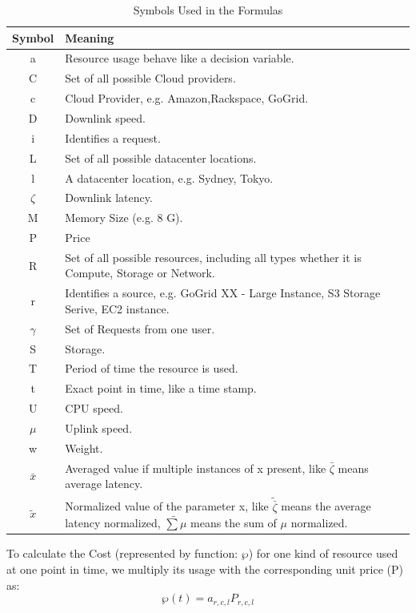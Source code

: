 \begin{longtable}[!ht]{|c|p{10cm}|}
\caption{Symbols Used in the Formulas} \label{table:formula_symbols}\\
\toprule
\textbf{Symbol }&  \textbf{Meaning  }  \\
\midrule
\endfirsthead
a & Resource usage behave like a decision variable. \\
\hline C & Set of all possible Cloud providers. \\
\hline c & Cloud Provider, e.g. Amazon,Rackspace, GoGrid. \\
\hline D & Downlink speed. \\
\hline i & Identifies a request. \\
\hline L & Set of all possible datacenter locations. \\
\hline l & A datacenter location, e.g. Sydney, Tokyo. \\
\hline $\zeta$ & Downlink latency. \\
\hline  M & Memory Size (e.g. 8 G). \\
\hline  P & Price \\
\hline  R & Set of all possible resources, including all types whether it is Compute, Storage or Network.\\
\hline  r & Identifies a source, e.g. GoGrid XX - Large Instance, S3 Storage Serive, EC2 instance.\\
\hline $\gamma $ & Set of Requests from one user. \\
\hline  S & Storage. \\
\hline  T & Period of time the resource is used. \\
\hline  t & Exact point in time, like a time stamp. \\
\hline  U & CPU speed. \\
\hline $\mu$ & Uplink speed. \\
\hline w & Weight. \\
\hline $\bar{x}$ & Averaged value if multiple instances of x present, like $\bar{\zeta}$ means average latency.\\
\hline $\tilde{x}$ & Normalized value of the parameter x, like $\tilde{\bar\zeta}$ means the average latency normalized, $\tilde{\sum \mu}$ means the sum of $\mu$ normalized.\\
\hline


\end{longtable}

To calculate the Cost (represented by function: $\wp $) for one kind of resource used at one point in time, we multiply its usage with the corresponding unit price (P) as:
\begin{equation}\label{eq:p}
\wp (t) = {a_{r,c,l}}{P_{r,c,l}}
\end{equation}

